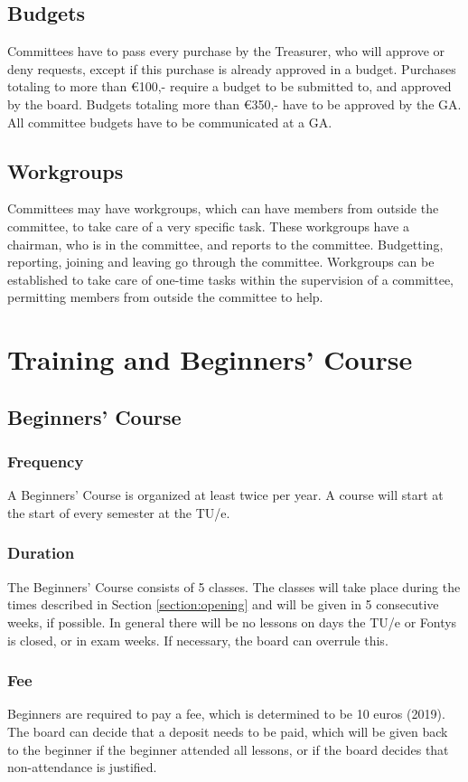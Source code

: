 \documentclass[a4paper]{article}
\begin{document}
\subsection{Budgets}
Committees have to pass every purchase by the Treasurer, who will approve or deny requests, except if this purchase is already approved in a budget. Purchases totaling to more than €100,- require a budget to be submitted to, and approved by the board. Budgets totaling more than €350,- have to be approved by the { GA}. All committee budgets have to be communicated at a { GA}.

\subsection{Workgroups}
Committees may have workgroups, which can have members from outside the committee, to take care of a very specific task. These workgroups have a chairman, who is in the committee, and reports to the committee. Budgetting, reporting, joining and leaving go through the committee. Workgroups can be established to take care of one-time tasks within the supervision of a committee, permitting members from outside the committee to help.

\section{Training and Beginners' Course}
\subsection{Beginners' Course}
\subsubsection{Frequency}
A { Beginners' Course} is organized at least twice per year. A course will start at the start of every semester at the { TU/e}.

\subsubsection{Duration}
The { Beginners' Course} consists of 5 classes. The classes will take place during the times described in Section \ref{section:opening} and will be given in 5 consecutive weeks, if possible. In general there will be no lessons on days the { TU/e} or Fontys is closed, or in exam weeks. If necessary, the board can overrule this.

\subsubsection{Fee}
{ Beginners} are required to pay a fee, which is determined to be 10 euros {\g (2019)}. The board can decide that a deposit needs to be paid, which will be given back to the { beginner} if the { beginner} attended all lessons, or if the board decides that non-attendance is justified.
\end{document}
